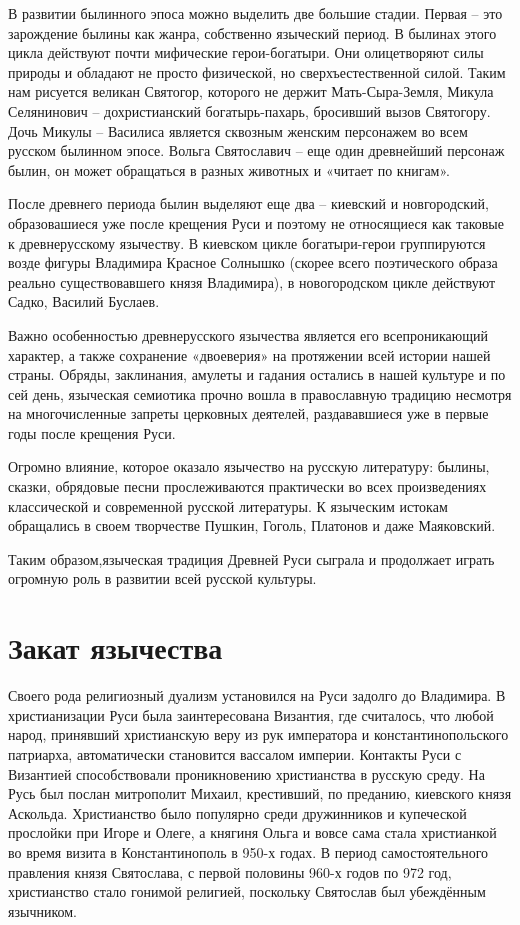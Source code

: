\documentclass[a4paper, 12pt]{report}
\begin{document}
В развитии былинного эпоса можно выделить две большие стадии. Первая – это зарождение былины как жанра, собственно языческий период. В былинах этого цикла действуют почти мифические герои-богатыри. Они олицетворяют силы природы и обладают не просто физической, но сверхъестественной силой. Таким нам рисуется великан Святогор, которого не держит Мать-Сыра-Земля, Микула Селянинович – дохристианский богатырь-пахарь, бросивший вызов Святогору. Дочь Микулы – Василиса является сквозным женским персонажем во всем русском былинном эпосе. Вольга Святославич – еще один древнейший персонаж былин, он может обращаться в разных животных и «читает по книгам». 

После древнего периода былин выделяют еще два – киевский и новгородский, образовашиеся уже после крещения Руси и поэтому не относящиеся как таковые к древнерусскому язычеству. В киевском цикле богатыри-герои группируются возде фигуры Владимира Красное Солнышко (скорее всего поэтического образа реально существовавшего князя Владимира), в новогородском цикле действуют Садко, Василий Буслаев.

Важно особенностью древнерусского язычества является его всепроникающий характер, а также сохранение «двоеверия» на протяжении всей истории нашей страны. Обряды, заклинания, амулеты и гадания остались в нашей культуре и по сей день, языческая семиотика прочно вошла в православную традицию несмотря на многочисленные запреты церковных деятелей, раздававшиеся уже в первые годы после крещения Руси.

Огромно влияние, которое оказало язычество на русскую литературу: былины, сказки, обрядовые песни прослеживаются практически во всех произведениях классической и современной русской литературы. К языческим истокам обращались в своем творчестве Пушкин, Гоголь, Платонов и даже Маяковский.

 Таким образом,языческая традиция Древней Руси сыграла и продолжает играть огромную роль в развитии всей русской культуры.

\chapter{Закат язычества}

Своего рода религиозный дуализм установился на Руси задолго до Владимира. В христианизации Руси была заинтересована Византия, где считалось, что любой народ, принявший христианскую веру из рук императора и константинопольского патриарха, автоматически становится вассалом империи. Контакты Руси с Византией способствовали проникновению христианства в русскую среду. На Русь был послан митрополит Михаил, крестивший, по преданию, киевского князя Аскольда. Христианство было популярно среди дружинников и купеческой прослойки при Игоре и Олеге, а княгиня Ольга и вовсе сама стала христианкой во время визита в Константинополь в 950-х годах. В период самостоятельного правления князя Святослава, с первой половины 960-х годов по 972 год, христианство стало гонимой религией, поскольку Святослав был убеждённым язычником.
\end{document}
